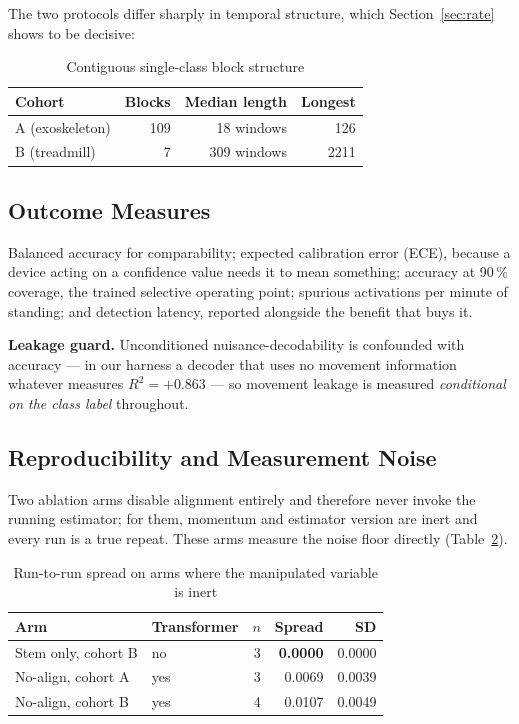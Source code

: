 \documentclass[preprint,12pt]{elsarticle}
\begin{document}
The two protocols differ sharply in temporal structure, which
Section~\ref{sec:rate} shows to be decisive:

\begin{table}[htbp]
\caption{Contiguous single-class block structure}
\label{tab:blocks}
\centering
\begin{tabular}{lrrr}
\toprule
Cohort & Blocks & Median length & Longest \\
\midrule
A (exoskeleton) & 109 & 18 windows & 126 \\
B (treadmill)   & 7   & 309 windows & 2211 \\
\bottomrule
\end{tabular}
\end{table}

\subsection{Outcome Measures}

Balanced accuracy for comparability; expected calibration error (ECE), because a
device acting on a confidence value needs it to mean something; accuracy at
90\,\% coverage, the trained selective operating point; spurious activations per
minute of standing; and detection latency, reported alongside the benefit that
buys it.

\textbf{Leakage guard.} Unconditioned nuisance-decodability is confounded with
accuracy --- in our harness a decoder that uses no movement information whatever
measures $R^2 = +0.863$ --- so movement leakage is measured \emph{conditional on
the class label} throughout.

\subsection{Reproducibility and Measurement Noise}
\label{sec:noise}

Two ablation arms disable alignment entirely and therefore never invoke the
running estimator; for them, momentum and estimator version are inert and every
run is a true repeat. These arms measure the noise floor directly
(Table~\ref{tab:noise}).

\begin{table}[htbp]
\caption{Run-to-run spread on arms where the manipulated variable is inert}
\label{tab:noise}
\centering
\begin{tabular}{llrrr}
\toprule
Arm & Transformer & $n$ & Spread & SD \\
\midrule
Stem only, cohort B      & no  & 3 & \textbf{0.0000} & 0.0000 \\
No-align, cohort A       & yes & 3 & 0.0069 & 0.0039 \\
No-align, cohort B       & yes & 4 & 0.0107 & 0.0049 \\
\bottomrule
\end{tabular}
\end{table}
\end{document}
